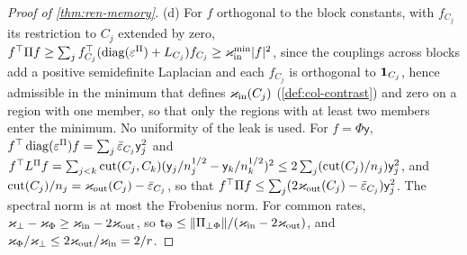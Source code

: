 \begin{proof}[Proof of \cref{thm:ren-memory}]
(d) For $f$ orthogonal to the block constants, with $f_{C_j}$ its restriction to $C_j$ extended by zero, $f^\top\Pi f\ge\sum_jf_{C_j}^\top(\operatorname{diag}(\varepsilon^\Pi)+L_{C_j})f_{C_j}\ge\varkappa_{\mathrm{in}}^{\min}\lvert f\rvert^2$, since the couplings across blocks add a positive semidefinite Laplacian and each $f_{C_j}$ is orthogonal to $\mathbf{1}_{C_j}$, hence admissible in the minimum that defines $\varkappa_{\mathrm{in}}(C_j)$ (\cref{def:col-contrast}) and zero on a region with one member, so that only the regions with at least two members enter the minimum. No uniformity of the leak is used. For $f=\Phi\mathsf y$, $f^\top\operatorname{diag}(\varepsilon^\Pi)f=\sum_j\bar\varepsilon_{C_j}\mathsf y_j^2$ and $f^\top L^\Pi f=\sum_{j<k}\operatorname{cut}(C_j,C_k)(\mathsf y_j/n_j^{1/2}-\mathsf y_k/n_k^{1/2})^2\le2\sum_j(\operatorname{cut}(C_j)/n_j)\mathsf y_j^2$, and $\operatorname{cut}(C_j)/n_j=\varkappa_{\mathrm{out}}(C_j)-\bar\varepsilon_{C_j}$, so that $f^\top\Pi f\le\sum_j(2\varkappa_{\mathrm{out}}(C_j)-\bar\varepsilon_{C_j})\mathsf y_j^2$. The spectral norm is at most the Frobenius norm. For common rates, $\varkappa_\perp-\varkappa_\Phi\ge\varkappa_{\mathrm{in}}-2\varkappa_{\mathrm{out}}$, so $\mathsf t_\Theta\le\Vert\Pi_{\perp\Phi}\Vert/(\varkappa_{\mathrm{in}}-2\varkappa_{\mathrm{out}})$, and $\varkappa_\Phi/\varkappa_\perp\le2\varkappa_{\mathrm{out}}/\varkappa_{\mathrm{in}}=2/r$.
\end{proof}

